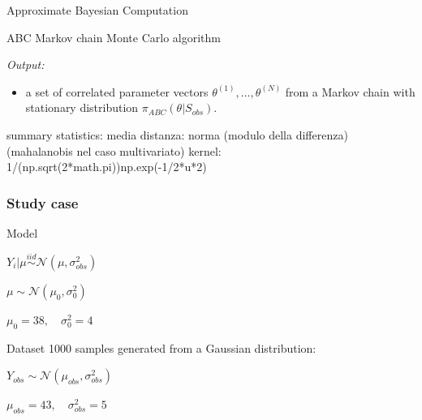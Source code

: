 \documentclass{beamer}
\begin{document}
\begin{section}{Approximate Bayesian Computation}
\begin{frame}{ABC Markov chain Monte Carlo algorithm}
{		\emph{Output:}
		\begin{itemize}
			\item a set of correlated parameter vectors $\theta ^ {(1)},..., \theta ^ {(N)}$ from a Markov chain with stationary distribution $\pi_{ABC}(\theta |S_{obs})$.
		\end{itemize}
	}
	\end{frame}
	
	\begin{frame}{}
		summary statistics: media
		distanza: norma (modulo della differenza)   (mahalanobis nel caso multivariato)
		kernel: 1/(np.sqrt(2*math.pi))np.exp(-1/2*u*2)
	\end{frame}

	\begin{frame}
		\frametitle{Study case}
		
		\begin{block}{Model}
			\begin{center}
				$ Y_i | \mu \overset{iid}{\sim} \mathcal{N}(\mu, \sigma_{obs} ^2) $\\
				
				\vspace{0.3cm}
				
				$ \mu  \sim \mathcal{N}(\mu_0, \sigma_0^2)$
				
				$\mu_0 = 38, \quad \sigma^2_0 = 4$
			\end{center}
		\end{block}
		
		\begin{block}{Dataset}
			1000 samples generated from a Gaussian distribution:
			\begin{center}
				$
				Y_{obs} \sim \mathcal{N}(\mu_{obs}, \sigma_{obs} ^2)
				$
				
				$
				\mu_{obs} = 43, \quad
				\sigma_{obs} ^2 = 5
				$
			\end{center}
		\end{block}
	\end{frame}
	
	\begin{frame}{}
	\end{frame}
	
	\begin{frame}{}
	\end{frame}


\end{section}
\end{document}
